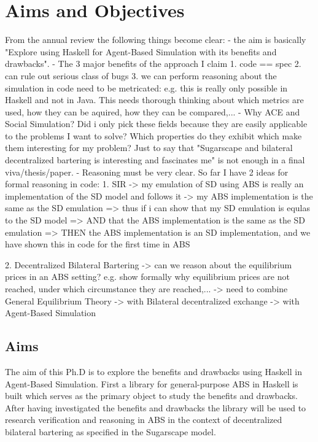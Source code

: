 \chapter{Aims and Objectives}
\label{chap:aimsObj}

From the annual review the following things become clear:
- the aim is basically "Explore using Haskell for Agent-Based Simulation with its benefits and drawbacks".
- The 3 major benefits of the approach I claim
	1. code == spec
	2. can rule out serious class of bugs
	3. we can perform reasoning about the simulation in code
	need to be metricated: e.g. this is really only possible in Haskell and not in Java. This needs thorough thinking about which metrics are used, how they can be aquired, how they can be compared,...
- Why ACE and Social Simulation? Did i only pick these fields because they are easily applicable to the problems I want to solve? Which properties do they exhibit which make them interesting for my problem? Just to say that "Sugarscape and bilateral decentralized bartering is interesting and fascinates me" is not enough in a final viva/thesis/paper.
- Reasoning must be very clear. So far I have 2 ideas for formal reasoning in code:
	1. SIR
		-> my emulation of SD using ABS is really an implementation of the SD model and follows it
		-> my ABS implementation is the same as the SD emulation
			=> thus if i can show that my SD emulation is equlas to the SD model
			=> AND that the ABS implementation is the same as the SD emulation
			=> THEN the ABS implementation is an SD implementation, and we have shown this in code for the first time in ABS

	2. Decentralized Bilateral Bartering
		-> can we reason about the equilibrium prices in an ABS setting? e.g. show formally why equilibrium prices are not reached, under which circumstance they are reached,...
			-> need to combine General Equilibrium Theory
			-> with Bilateral decentralized exchange
			-> with Agent-Based Simulation 

\section{Aims}
The aim of this Ph.D is to explore the benefits and drawbacks using Haskell in  Agent-Based Simulation. First a library for general-purpose ABS in Haskell is built which serves as the primary object to study the benefits and drawbacks. After having investigated the benefits and drawbacks the library will be used to research  verification and reasoning in ABS in the context of decentralized bilateral bartering as specified in the Sugarscape model.

